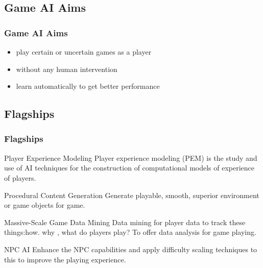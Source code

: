 \documentclass{beamer}
\begin{document}
\subsection{Game AI Aims}
\begin{frame}
\frametitle{Game AI Aims}
\begin{itemize}
\item play certain or uncertain games as a player
\item without any human intervention
\item learn automatically to get better performance
\end{itemize}
\end{frame}

\subsection{Flagships}
\begin{frame}
\frametitle{Flagships\cite{2}}
\begin{block}{Player Experience Modeling\cite{3}}
  Player experience modeling (PEM) is the study and use of
  AI techniques for the construction of computational models
  of experience of players. 
\end{block}

\begin{block}{Procedural Content Generation\cite{4}}
  Generate playable, smooth, superior environment or game objects for game.
\end{block}


\begin{block}{Massive-Scale Game Data Mining\cite{5,6}}
  Data mining for player data to track these things:how. why , what do players play? To offer data analysis for game playing.
\end{block}

\begin{block}{NPC AI\cite{7,8,9}}
  Enhance the NPC capabilities and apply difficulty scaling techniques to this to improve the playing experience.

\end{block}
\end{frame}


\end{document}
